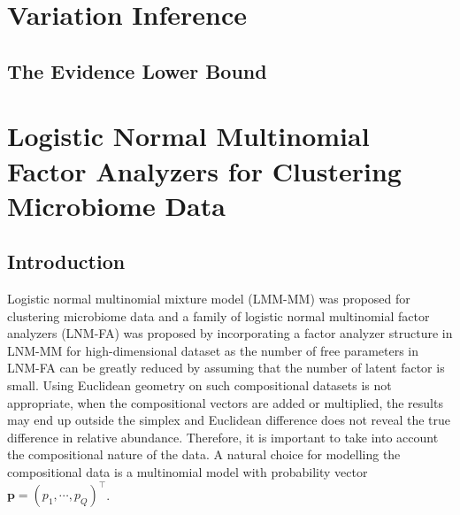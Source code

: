 \documentclass[]{report}
\theoremstyle{definition}
\begin{document}
\section{Variation Inference}
\subsection{The Evidence Lower Bound}

\newpage
\section{Logistic Normal Multinomial Factor Analyzers for Clustering Microbiome Data}
\subsection{Introduction}
Logistic normal multinomial mixture model (LMM-MM) was proposed for clustering microbiome data and a family of logistic normal multinomial factor analyzers (LNM-FA) was proposed by incorporating a factor analyzer structure in LNM-MM for high-dimensional dataset as the number of free parameters in LNM-FA can be greatly reduced by assuming that the number of latent factor is small.
Using Euclidean geometry on such compositional datasets is not appropriate, when the compositional vectors are added or multiplied, the results may end up outside the simplex and Euclidean difference does not reveal the true difference in relative abundance. Therefore, it is important to take into account the compositional nature of the data. 
A natural choice for modelling the compositional data is a multinomial model with probability vector $\boldsymbol{p}=(p_{1},\cdots,p_{Q})^{\top}$.
\end{document}
